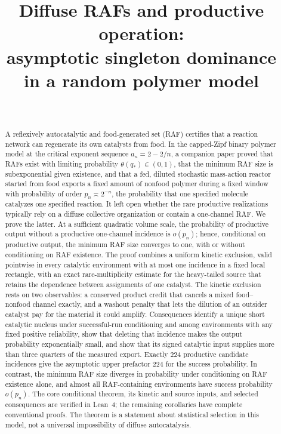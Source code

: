 \documentclass[11pt,letterpaper]{article}
\title{Diffuse RAFs and productive operation:\\ asymptotic singleton dominance\\ in a random polymer model}
\author{\PaperAuthor\\[2pt]\small\PaperAffiliation}
\date{\PaperDate}
\theoremstyle{plain}
\theoremstyle{definition}
\theoremstyle{remark}
\numberwithin{equation}{section}
\begin{document}
\maketitle

\begin{abstract}
A reflexively autocatalytic and food-generated set (RAF) certifies that a reaction network can regenerate its own catalysts from food. In the capped-Zipf binary polymer model at the critical exponent sequence $a_n=2-2/n$, a companion paper proved that RAFs exist with limiting probability $\theta(q_*)\in(0,1)$, that the minimum RAF size is subexponential given existence, and that a fed, diluted stochastic mass-action reactor started from food exports a fixed amount of nonfood polymer during a fixed window with probability of order $p_n\asymp2^{-n}$, the probability that one specified molecule catalyzes one specified reaction. It left open whether the rare productive realizations typically rely on a diffuse collective organization or contain a one-channel RAF. We prove the latter. At a sufficient quadratic volume scale, the probability of productive output without a productive one-channel incidence is $o(p_n)$; hence, conditional on productive output, the minimum RAF size converges to one, with or without conditioning on RAF existence. The proof combines a uniform kinetic exclusion, valid pointwise in every catalytic environment with at most one incidence in a fixed local rectangle, with an exact rare-multiplicity estimate for the heavy-tailed source that retains the dependence between assignments of one catalyst. The kinetic exclusion rests on two observables: a conserved product credit that cancels a mixed food--nonfood channel exactly, and a washout penalty that lets the dilution of an outsider catalyst pay for the material it could amplify. Consequences identify a unique short catalytic nucleus under successful-run conditioning and among environments with any fixed positive reliability, show that deleting that incidence makes the output probability exponentially small, and show that its signed catalytic input supplies more than three quarters of the measured export. Exactly $224$ productive candidate incidences give the asymptotic upper prefactor $224$ for the success probability. In contrast, the minimum RAF size diverges in probability under conditioning on RAF existence alone, and almost all RAF-containing environments have success probability $o(p_n)$. The core conditional theorem, its kinetic and source inputs, and selected consequences are verified in Lean~4; the remaining corollaries have complete conventional proofs. The theorem is a statement about statistical selection in this model, not a universal impossibility of diffuse autocatalysis.
\end{abstract}
\end{document}
